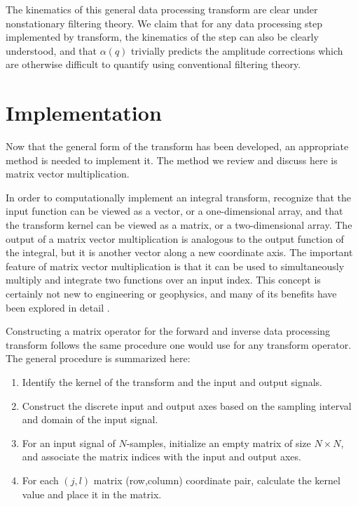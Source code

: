 The kinematics of this general data processing transform are clear under nonstationary filtering theory.
We claim that for any data processing step implemented by transform, the kinematics of the step can also be clearly understood, and that $\alpha \left( q \right)$ trivially predicts the amplitude corrections which are otherwise difficult to quantify using conventional filtering theory.  


\section{Implementation}

\label{sec:DPTa}
Now that the general form of the transform has been developed, an appropriate method is needed to implement it.
The method we review and discuss here is matrix vector multiplication.

In order to computationally implement an integral transform, recognize that the input function can be viewed as a vector, or a one-dimensional array, and that the transform kernel can be viewed as a matrix, or a two-dimensional array.
The output of a matrix vector multiplication is analogous to the output function of the integral, but it is another vector along a new coordinate axis.
The important feature of matrix vector multiplication is that it can be used to simultaneously multiply and integrate two functions over an input index.
This concept is certainly not new to engineering or geophysics, and many of its benefits have been explored in detail \cite{claerbout92}.

Constructing a matrix operator for the forward and inverse data processing transform follows the same procedure one would use for any transform operator.  The general procedure is summarized here:
\begin{enumerate}
\item Identify the kernel of the transform and the input and output signals.
\item Construct the discrete input and output axes based on the sampling interval and domain of the input signal.
\item For an input signal of $N$-samples, initialize an empty matrix of size $N \times N$, and associate the matrix indices with the input and output axes.
\item For each $\left( j, l \right)$ matrix (row,column) coordinate pair, calculate the kernel value and place it in the matrix.  
\end{enumerate}

